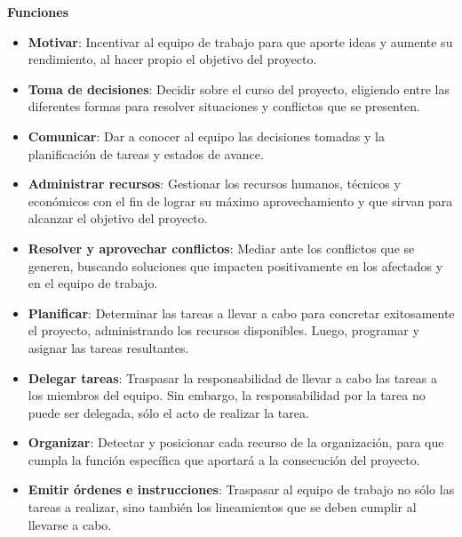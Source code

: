 \textbf{    Funciones}
            \begin{itemize}
                \item \textbf{Motivar}:
                Incentivar al equipo de trabajo para que aporte ideas y aumente su rendimiento, al hacer propio el objetivo del proyecto.
                
                \item \textbf{Toma de decisiones}:
                Decidir sobre el curso del proyecto, eligiendo entre las diferentes formas para resolver situaciones y conflictos que se presenten.
                
                \item \textbf{Comunicar}:
                Dar a conocer al equipo las decisiones tomadas y la planificación de tareas y estados de avance.
                
                \item \textbf{Administrar recursos}:
                Gestionar los recursos humanos, técnicos y económicos con el fin de lograr su máximo aprovechamiento y que sirvan para alcanzar el objetivo del proyecto.
                
                \item \textbf{Resolver y aprovechar conflictos}:
                Mediar ante los conflictos que se generen, buscando soluciones que impacten positivamente en los afectados y en el equipo de trabajo.
                
                \item \textbf{Planificar}:
                Determinar las tareas a llevar a cabo para concretar exitosamente el proyecto, administrando los recursos disponibles.
                Luego, programar y asignar las tareas resultantes.
                
                \item \textbf{Delegar tareas}:
                Traspasar la responsabilidad de llevar a cabo las tareas a los miembros del equipo.
                Sin embargo, la responsabilidad por la tarea no puede ser delegada, sólo el acto de realizar la tarea.
                
                \item \textbf{Organizar}:
                Detectar y posicionar cada recurso de la organización, para que cumpla la función específica que aportará a la consecución del proyecto.
                
                \item \textbf{Emitir órdenes e instrucciones}:
                Traspasar al equipo de trabajo no sólo las tareas a realizar, sino también los lineamientos que se deben cumplir al llevarse a cabo.
                

\end{itemize}

